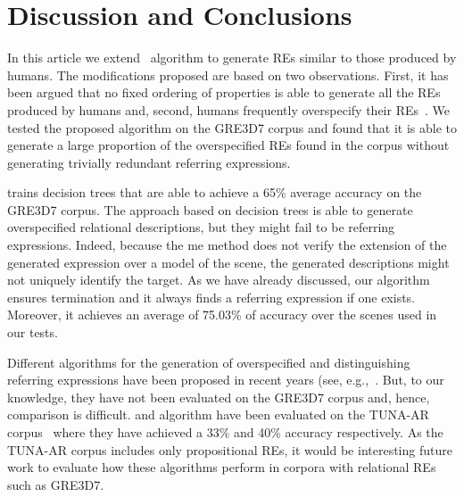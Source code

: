 \section{Discussion and Conclusions} \label{sec:discussion}

In this article we extend~ algorithm to generate REs similar to those produced by humans. The modifications 
proposed are based on two observations. First, it has been argued that no fixed ordering of properties is able to generate all the REs produced by humans and, second, humans frequently overspecify their REs~\cite{Engelhardt_Bailey_Ferreira_2006,Arts_Maes_Noordman_Jansen_2011,viet:gene11}. We tested 
the proposed algorithm on the GRE3D7 corpus and found that it is able to generate a large proportion of the overspecified REs found in the corpus without generating trivially redundant referring expressions.

 trains decision trees that are able to achieve a 65\% average accuracy on the GRE3D7 corpus. 
The approach based on decision trees is able to generate overspecified relational descriptions, but they might fail to be referring 
expressions. Indeed, because the me method does not verify the extension of the generated expression over a model of the scene, the 
generated descriptions might not uniquely identify the target.  As we have already discussed,
our algorithm ensures termination and it always finds a referring expression if one exists.  Moreover, it achieves an average of 75.03\% of accuracy over the scenes used in our tests. 

Different algorithms for the generation of overspecified and distinguishing referring expressions have been proposed in recent years 
(see, e.g.,~\cite{delucena-paraboni:2008:ENLG,ruud-emiel-mariet:2012:INLG2012}.  But, to our knowledge, they have not been evaluated on the 
GRE3D7 corpus and, hence, comparison is difficult.  and  algorithm
have been evaluated on the TUNA-AR corpus~\cite{gatt-balz-kow:2008:ENLG} where they have achieved a 33\% and 40\% accuracy respectively. 
As the TUNA-AR corpus includes only propositional REs, it would be interesting future work to evaluate how these algorithms perform in corpora with relational REs such as GRE3D7. 

